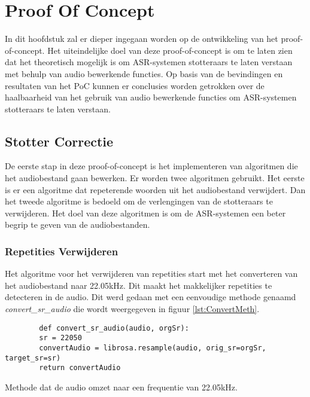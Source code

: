 \chapter{Proof Of Concept}%
\label{ch:Proof of Concept}

In dit hoofdstuk zal er dieper ingegaan worden op de ontwikkeling van het proof-of-concept. Het uiteindelijke doel van deze proof-of-concept is om te laten zien dat het theoretisch mogelijk is om ASR-systemen stotteraars te laten verstaan met behulp van audio bewerkende functies. Op basis van de bevindingen en resultaten van het PoC kunnen er conclusies worden getrokken over de haalbaarheid van het gebruik van audio bewerkende functies om ASR-systemen stotteraars te laten verstaan.
\section{Stotter Correctie}
De eerste stap in deze proof-of-concept is het implementeren van algoritmen die het audiobestand gaan bewerken. Er worden twee algoritmen gebruikt. Het eerste is er een algoritme dat repeterende woorden uit het audiobestand verwijdert. Dan het tweede algoritme is bedoeld om de verlengingen van de stotteraars te verwijderen. Het doel van deze algoritmen is om de ASR-systemen een beter begrip te geven van de audiobestanden.

\subsection{Repetities Verwijderen}
Het algoritme voor het verwijderen van repetities start met het converteren van het audiobestand naar 22.05kHz. Dit maakt het makkelijker repetities te detecteren in de audio. Dit werd gedaan met een eenvoudige methode genaamd \emph{convert\_sr\_audio} die wordt weergegeven in figuur \ref{lst:ConvertMeth}.\\

\begin{listing}[H]
    \begin{verbatim}
        def convert_sr_audio(audio, orgSr):
        sr = 22050
        convertAudio = librosa.resample(audio, orig_sr=orgSr, target_sr=sr)
        return convertAudio
    \end{verbatim}
    \caption{Methode dat de audio omzet naar een frequentie van 22.05kHz.}
    \label{lst:ConvertMeth}
\end{listing}


